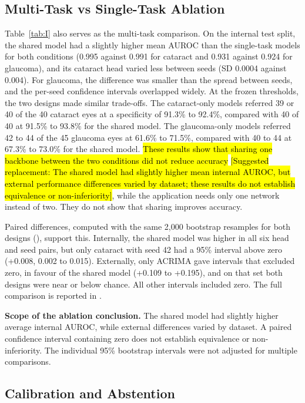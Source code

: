 \documentclass[conference,a4paper]{IEEEtran}
\newcommand{\proposedreplacement}[1]{{\sethlcolor{reviewred}\hl{#1}}}
\newcommand{\suggestedwording}[1]{{\sethlcolor{reviewgreen}\hl{[Suggested replacement: #1]}}}
\newcommand{\peachaddition}[1]{%
  \par\smallskip\noindent
  \begingroup\setlength{\fboxsep}{5pt}%
  \colorbox{reviewpeach}{\begin{minipage}{\dimexpr\linewidth-2\fboxsep\relax}
  #1
  \end{minipage}}\endgroup\par\smallskip
}
\begin{document}
\subsection{Multi-Task vs Single-Task Ablation}

Table~\ref{tab:I} also serves as the multi-task comparison. On the internal test split, the shared
model had a slightly higher mean AUROC than the single-task models for both conditions (0.995
against 0.991 for cataract and 0.931 against 0.924 for glaucoma), and its cataract head varied less
between seeds (SD 0.0004 against 0.004). For glaucoma, the difference was smaller than the spread
between seeds, and the per-seed confidence intervals overlapped widely. At the frozen thresholds,
the two designs made similar trade-offs. The cataract-only models referred 39 or 40 of the 40
cataract eyes at a specificity of 91.3\% to 92.4\%, compared with 40 of 40 at 91.5\% to 93.8\% for
the shared model. The glaucoma-only models referred 42 to 44 of the 45 glaucoma eyes at 61.6\% to
71.5\%, compared with 40 to 44 at 67.3\% to 73.0\% for the shared model. \proposedreplacement{These results show that
sharing one backbone between the two conditions did not reduce accuracy} \suggestedwording{The shared model had slightly higher mean internal AUROC, but external performance differences varied by dataset; these results do not establish equivalence or non-inferiority}, while the application needs
only one network instead of two. They do not show that sharing improves accuracy.

Paired differences, computed with the same 2,000 bootstrap resamples for both designs
(), support this. Internally, the shared model was
higher in all six head and seed pairs, but only cataract with seed 42 had a 95\% interval above zero
(+0.008, 0.002 to 0.015). Externally, only ACRIMA gave intervals that excluded zero, in favour of
the shared model (+0.109 to +0.195), and on that set both designs were near or below chance. All
other intervals included zero. The full comparison is reported in
.


\peachaddition{
\textbf{Scope of the ablation conclusion.}
The shared model had slightly higher average internal AUROC, while external
differences varied by dataset. A paired confidence interval containing zero
does not establish equivalence or non-inferiority. The individual 95\%
bootstrap intervals were not adjusted for multiple comparisons.
}

\subsection{Calibration and Abstention}
\end{document}
